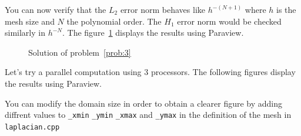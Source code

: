 You can now verify that the $L_2$ error norm behaves like $h^{-(N+1)}$
where $h$ is the mesh size and $N$ the polynomial order. The $H_1$
error norm would be checked similarly in $h^{-N}$. The
figure~\ref{fig:2} displays the results using Paraview.

\begin{figure}[!h]%
  \centering
  \caption{Solution of problem~\ref{prob:3}}
  \label{fig:2}
\end{figure}

Let's try a parallel computation using 3 processors. The following figures display the results using Paraview.
\begin{remark}
 You can modify the domain size in order to obtain a clearer figure by adding diffrent values to \lstinline!_xmin!    \lstinline!_ymin!   \lstinline!_xmax! and  \lstinline!_ymax!  in the definition of the mesh in \lstinline!laplacian.cpp!
 \end{remark}

